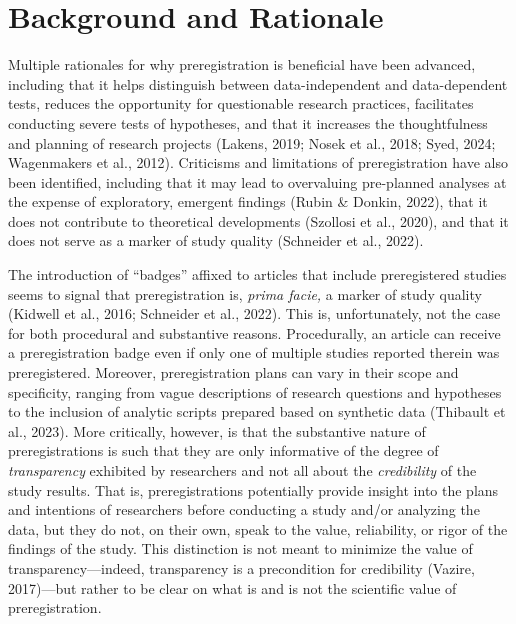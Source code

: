 \documentclass[authordate, meta, issue]{jote-new-article}
\begin{document}
	\section{\textbf{Background and Rationale}}



	Multiple rationales for why preregistration is beneficial have been advanced, including that it helps distinguish between data-independent and data-dependent tests, reduces the opportunity for questionable research practices, facilitates conducting severe tests of hypotheses, and that it increases the thoughtfulness and planning of research projects (Lakens, 2019; Nosek et al., 2018; Syed, 2024; Wagenmakers et al., 2012). Criticisms and limitations of preregistration have also been identified, including that it may lead to overvaluing pre-planned analyses at the expense of exploratory, emergent findings (Rubin \& Donkin, 2022), that it does not contribute to theoretical developments (Szollosi et al., 2020), and that it does not serve as a marker of study quality (Schneider et al., 2022).



	The introduction of “badges” affixed to articles that include preregistered studies seems to signal that preregistration is, \emph{prima facie,} a marker of study quality (Kidwell et al., 2016; Schneider et al., 2022). This is, unfortunately, not the case for both procedural and substantive reasons. Procedurally, an article can receive a preregistration badge even if only one of multiple studies reported therein was preregistered. Moreover, preregistration plans can vary in their scope and specificity, ranging from vague descriptions of research questions and hypotheses to the inclusion of analytic scripts prepared based on synthetic data (Thibault et al., 2023). More critically, however, is that the substantive nature of preregistrations is such that they are only informative of the degree of \emph{transparency} exhibited by researchers and not all about the \emph{credibility} of the study results. That is, preregistrations potentially provide insight into the plans and intentions of researchers before conducting a study and/or analyzing the data, but they do not, on their own, speak to the value, reliability, or rigor of the findings of the study. This distinction is not meant to minimize the value of transparency—indeed, transparency is a precondition for credibility (Vazire, 2017)—but rather to be clear on what is and is not the scientific value of preregistration.
\end{document}
